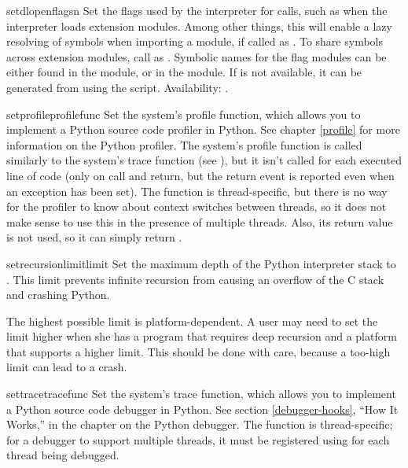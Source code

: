 \begin{funcdesc}{setdlopenflags}{n}
  Set the flags used by the interpreter for 
  calls, such as when the interpreter loads extension modules.  Among
  other things, this will enable a lazy resolving of symbols when
  importing a module, if called as .  To
  share symbols across extension modules, call as
  .  Symbolic
  names for the flag modules can be either found in the 
  module, or in the  module. If  is not
  available, it can be generated from 
  using the  script.
  Availability: \UNIX.
\end{funcdesc}

\begin{funcdesc}{setprofile}{profilefunc}
  Set the system's profile function, which
  allows you to implement a Python source code profiler in
  Python.  See chapter \ref{profile} for more
  information on the Python profiler.  The system's profile function
  is called similarly to the system's trace function (see
  ), but it isn't called for each executed line
  of code (only on call and return, but the return event is reported
  even when an exception has been set).  The function is
  thread-specific, but there is no way for the profiler to know about
  context switches between threads, so it does not make sense to use
  this in the presence of multiple threads.
  Also, its return value is not used, so it can simply return
  .
\end{funcdesc}

\begin{funcdesc}{setrecursionlimit}{limit}
  Set the maximum depth of the Python interpreter stack to
  .  This limit prevents infinite recursion from causing an
  overflow of the C stack and crashing Python.

  The highest possible limit is platform-dependent.  A user may need
  to set the limit higher when she has a program that requires deep
  recursion and a platform that supports a higher limit.  This should
  be done with care, because a too-high limit can lead to a crash.
\end{funcdesc}

\begin{funcdesc}{settrace}{tracefunc}
  Set the system's trace function, which allows
  you to implement a Python source code debugger in Python.  See
  section \ref{debugger-hooks}, ``How It Works,'' in the chapter on
  the Python debugger.  The function is
  thread-specific; for a debugger to support multiple threads, it must
  be registered using  for each thread being
  debugged.
\end{funcdesc}

